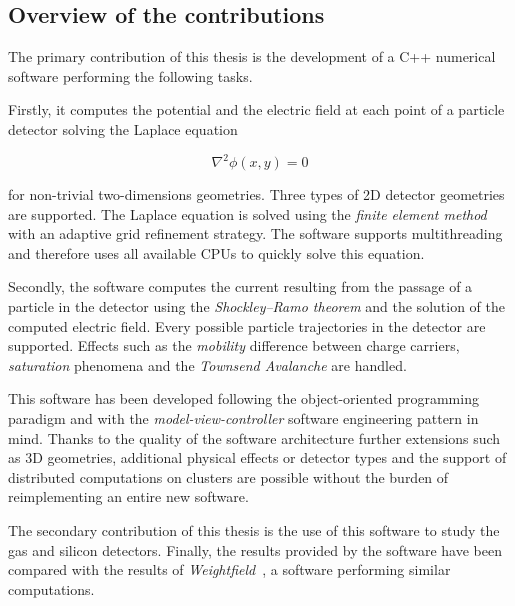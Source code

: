 \documentclass[11pt]{article}
\begin{document}

	\subsection*{Overview of the contributions}

		The primary contribution of this thesis is the development of a C++ numerical software performing the
		following tasks.

		Firstly, it computes the potential and the electric field
		at each point of a particle detector solving the Laplace equation

		\[\nabla^2 \phi(x,y) = 0\]

		for non-trivial	two-dimensions geometries. Three types of 2D detector geometries are supported.
		The Laplace equation is solved using the \textit{finite element method} with an adaptive
		grid refinement strategy. The software supports multithreading and therefore
		uses all available CPUs to quickly solve this equation.

		Secondly, the software computes the current resulting from the passage of a particle
		in the detector using the \textit{Shockley–Ramo theorem} and the solution of the
		computed electric field. Every possible particle trajectories in the detector
		are supported. Effects such as the \textit{mobility} difference between
		charge carriers, \textit{saturation} phenomena and the
		\textit{Townsend Avalanche} are handled.

		This software has been developed following the object-oriented
		programming paradigm and with the \textit{model-view-controller}
		software engineering pattern in mind. Thanks to the quality of the software
		architecture further extensions such as 3D geometries, additional physical effects or
		detector types and the support of distributed computations on clusters are possible
		without the burden of reimplementing an entire new software.

		The secondary contribution of this thesis is the use of this software to study
		the gas and silicon detectors. Finally, the results provided by the
		software have been compared with the results of \textit{Weightfield}~\cite{Cenna2015}, a
		software performing similar computations.
\end{document}
